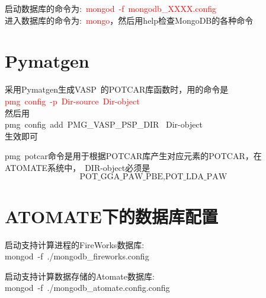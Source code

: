\documentclass[10pt,a4paper]{article}
\begin{document}
启动数据库的命令为:~\textrm{\textcolor{red}{mongod~-f~mongodb\_XXXX.config}}\\

进入数据库的命令为:~\textrm{\textcolor{red}{mongo}}，然后用\textrm{help}检查\textrm{MongoDB}的各种命令

\section{\rm{Pymatgen}}
采用\textrm{Pymatgen}生成\textrm{VASP}~的\textrm{POTCAR}库函数时，用的命令是\\
\textcolor{red}{\textrm{pmg~config~-p~Dir-source~Dir-object}}\\
然后用\\
\textrm{pmg~config~add~PMG\_VASP\_PSP\_DIR ~Dir-object} \\
生效即可

\textrm{pmg~potcar}命令是用于根据\textrm{POTCAR}库产生对应元素的\textrm{POTCAR}，在\textrm{ATOMATE}系统中，\textrm{~DIR-object}必须是\[\textrm{POT\_GGA\_PAW\_PBE},\textrm{POT\_LDA\_PAW}\]

\section{\rm{ATOMATE}下的数据库配置}
启动支持计算进程的\textrm{FireWorks}数据库:\\
\textrm{mongod~-f~./mongodb\_fireworks.config}

启动支持计算数据存储的\textrm{Atomate}数据库:\\
\textrm{mongod~-f~./mongodb\_atomate.config.config}
\end{document}
